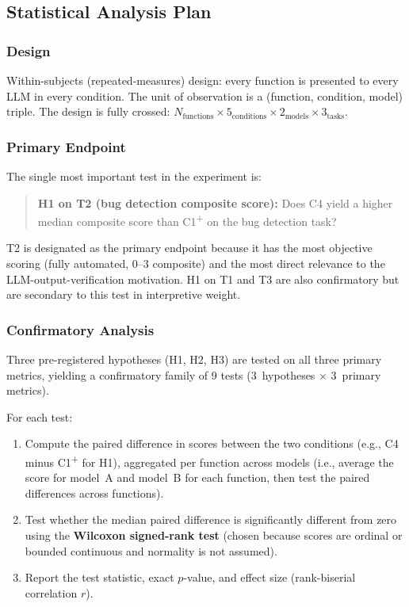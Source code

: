 \documentclass[11pt]{article}
\begin{document}
\subsection{Statistical Analysis Plan}

\subsubsection*{Design}

Within-subjects (repeated-measures) design: every function is
presented to every LLM in every condition.  The unit of observation is
a (function, condition, model) triple.  The design is fully crossed:
$N_{\text{functions}} \times 5_{\text{conditions}} \times
2_{\text{models}} \times 3_{\text{tasks}}$.

\subsubsection*{Primary Endpoint}

The single most important test in the experiment is:

\begin{quote}
  \textbf{H1 on T2 (bug detection composite score):}  Does C4
  yield a higher median composite score than C1\textsuperscript{+}
  on the bug detection task?
\end{quote}

T2 is designated as the primary endpoint because it has the most
objective scoring (fully automated, 0--3 composite) and the most
direct relevance to the LLM-output-verification motivation.  H1 on
T1 and T3 are also confirmatory but are secondary to this test in
interpretive weight.

\subsubsection*{Confirmatory Analysis}

Three pre-registered hypotheses (H1, H2, H3) are tested on all three
primary metrics, yielding a confirmatory family of 9 tests
(3~hypotheses $\times$ 3~primary metrics).

For each test:
\begin{enumerate}[nosep]
  \item Compute the paired difference in scores between the two
        conditions (e.g., C4 minus C1\textsuperscript{+} for H1),
        aggregated per function across models (i.e., average the
        score for model~A and model~B for each function, then test
        the paired differences across functions).
  \item Test whether the median paired difference is significantly
        different from zero using the \textbf{Wilcoxon signed-rank
        test} (chosen because scores are ordinal or bounded continuous
        and normality is not assumed).
  \item Report the test statistic, exact $p$-value, and effect size
        (rank-biserial correlation $r$).
\end{enumerate}
\end{document}
